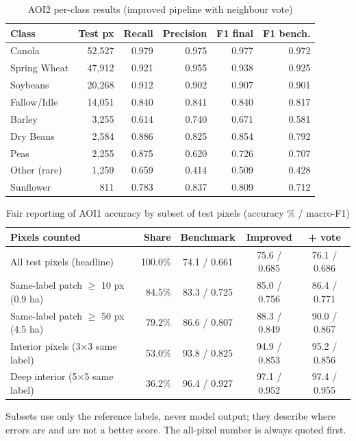 \begin{table}[htbp]
\centering\small
\caption{AOI2 per-class results (improved pipeline with neighbour vote)}
\label{tab:perclass2}
\begin{tabular}{L{3.2cm} r r r r r}
\toprule
\textbf{Class} & \textbf{Test px} & \textbf{Recall} & \textbf{Precision} & \textbf{F1 final} & \textbf{F1 bench.}\\
\midrule
Canola & 52,527 & 0.979 & 0.975 & 0.977 & 0.972\\
Spring Wheat & 47,912 & 0.921 & 0.955 & 0.938 & 0.925\\
Soybeans & 20,268 & 0.912 & 0.902 & 0.907 & 0.901\\
Fallow/Idle & 14,051 & 0.840 & 0.841 & 0.840 & 0.817\\
Barley & 3,255 & 0.614 & 0.740 & 0.671 & 0.581\\
Dry Beans & 2,584 & 0.886 & 0.825 & 0.854 & 0.792\\
Peas & 2,255 & 0.875 & 0.620 & 0.726 & 0.707\\
Other (rare) & 1,259 & 0.659 & 0.414 & 0.509 & 0.428\\
Sunflower & 811 & 0.783 & 0.837 & 0.809 & 0.712\\
\bottomrule
\end{tabular}
\end{table}

\begin{table}[htbp]
\centering\small
\caption{Fair reporting of AOI1 accuracy by subset of test pixels (accuracy \% / macro-F1)}
\label{tab:subsets}
\begin{tabular}{L{5.6cm} r c c c}
\toprule
\textbf{Pixels counted} & \textbf{Share} & \textbf{Benchmark} & \textbf{Improved} & \textbf{+ vote}\\
\midrule
All test pixels (headline) & 100.0\% & 74.1 / 0.661 & 75.6 / 0.685 & 76.1 / 0.686\\
Same-label patch $\geq$ 10 px (0.9 ha) & 84.5\% & 83.3 / 0.725 & 85.0 / 0.756 & 86.4 / 0.771\\
Same-label patch $\geq$ 50 px (4.5 ha) & 79.2\% & 86.6 / 0.807 & 88.3 / 0.849 & 90.0 / 0.867\\
Interior pixels (3$\times$3 same label) & 53.0\% & 93.8 / 0.825 & 94.9 / 0.853 & 95.2 / 0.856\\
Deep interior (5$\times$5 same label) & 36.2\% & 96.4 / 0.927 & 97.1 / 0.952 & 97.4 / 0.955\\
\bottomrule
\end{tabular}
\end{table}
Subsets use only the reference labels, never model output; they describe where errors are and are not
a better score. The all-pixel number is always quoted first.

